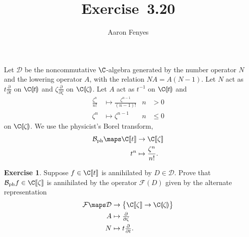 \documentclass{article}
\title{Exercise~3.20}
\author{Aaron Fenyes}
\theoremstyle{definition}
\newtheorem*{exr}{Exercise}
\theoremstyle{plain}
\newcommand{\phborel}{\mathcal{B}_\text{ph}}
\newcommand{\dict}{\mathcal{F}}
\begin{document}
\maketitle
Let $\mathcal{D}$ be the noncommutative $\C$-algebra generated by the number operator $N$ and the lowering operator $A$, with the relation $NA = A(N-1)$. Let $N$ act as $t \tfrac{\partial}{\partial t}$ on $\C\llparenthesis t \rrparenthesis$ and $\zeta \tfrac{\partial}{\partial \zeta}$ on $\C\llparenthesis \zeta \rrparenthesis$. Let $A$ act as $t^{-1}$ on $\C\llparenthesis t \rrparenthesis$ and
\begin{align*}
\frac{\zeta^n}{n!} & \mapsto \frac{\zeta^{n-1}}{(n-1)!} & n & > 0 \\
\zeta^n & \mapsto \zeta^{n-1} & n & \le 0
\end{align*}
on $\C\llparenthesis \zeta \rrparenthesis$. We use the physicist's Borel transform,
\begin{align*}
\phborel \maps \C\llbracket t \rrbracket & \to \C\llbracket \zeta \rrbracket \\
t^n & \mapsto \frac{\zeta^n}{n!}.
\end{align*}
\begin{exr}
Suppose $f \in \C\llbracket t \rrbracket$ is annihilated by $D \in \mathcal{D}$. Prove that $\phborel f \in \C\llbracket \zeta \rrbracket$ is annihilated by the operator $\dict(D)$ given by the alternate representation
\begin{align*}
\dict \maps \mathcal{D} & \to \big\{\C\llbracket \zeta \rrbracket \to \C\llparenthesis \zeta \rrparenthesis\big\} \\
A & \mapsto \tfrac{\partial}{\partial \zeta} \\
N & \mapsto t \tfrac{\partial}{\partial t}.
\end{align*}
\end{exr}
\end{document}
